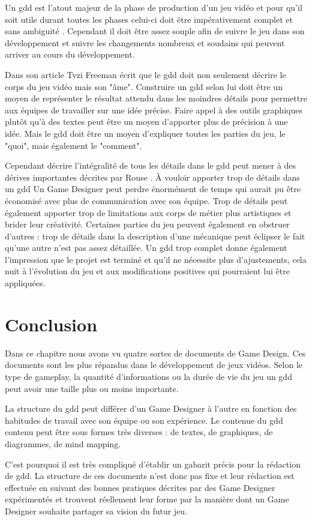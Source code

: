 Un \gls{gdd} est l'atout majeur de la phase de production d'un jeu vidéo et pour qu'il soit utile durant toutes les phases celui-ci doit être impérativement complet et sans ambiguité \cite{GD_Guidelines}. Cependant il doit être assez souple afin de suivre le jeu dans son développement et suivre les changements nombreux et soudains qui peuvent arriver au cours du développement.

Dans son article  \cite{gama_greateGDD} Tvzi Freeman écrit que le \gls{gdd} doit non seulement décrire le corps du jeu vidéo mais son "âme". Construire un \gls{gdd} selon lui doit être un moyen de représenter le résultat attendu dans les moindres détails pour permettre aux équipes de travailler sur une idée précise. Faire appel à des outils graphiques plutôt qu'à des textes peut être un moyen d'apporter plus de précision à une idée. Mais le \gls{gdd} doit être un moyen d'expliquer toutes les parties du jeu, le "quoi", mais également le "comment".

Cependant décrire l'intégralité de tous les détails dans le \gls{gdd} peut mener à des dérives importantes décrites par Rouse \cite{GD_theory_rouse}. À vouloir apporter trop de détails dans un \gls{gdd} Un Game Designer peut perdre énormément de temps qui aurait pu être économisé avec plus de communication avec son équipe. Trop de détails peut également apporter trop de limitations aux corps de métier plus artistiques et brider leur créativité. Certaines parties du jeu peuvent également en obstruer d'autres : trop de détails dans la description d'une mécanique peut éclipser le fait qu'une autre n'est pas assez détaillée. Un \gls{gdd} trop complet donne également l'impression que le projet est terminé et qu'il ne nécessite plus d'ajustements, cela nuit à l'évolution du jeu et aux modifications positives qui pourraient lui être appliquées.



\section{Conclusion}
Dans ce chapitre nous avons vu quatre sortes de documents de Game Design. Ces documents sont les plus répandus dans le développement de jeux vidéos. Selon le type de gameplay, la quantité d'informations ou la durée de vie du jeu un \gls{gdd} peut avoir une taille plus ou moins importante. 

La structure du \gls{gdd} peut différer d'un Game Designer à l'autre en fonction des habitudes de travail avec son équipe ou son expérience. Le contenue du \gls{gdd} contenu peut être sous formes très diverses : de textes, de graphiques, de diagrammes, de mind mapping. 

C'est pourquoi il est très compliqué d'établir un gabarit précis pour la rédaction de \gls{gdd}. La structure de ces documents n'est donc pas fixe et leur rédaction est effectuée en suivant des bonnes pratiques décrites par des Game Designer expérimentés et trouvent réellement leur forme par la manière dont un Game Designer souhaite partager sa vision du futur jeu.
